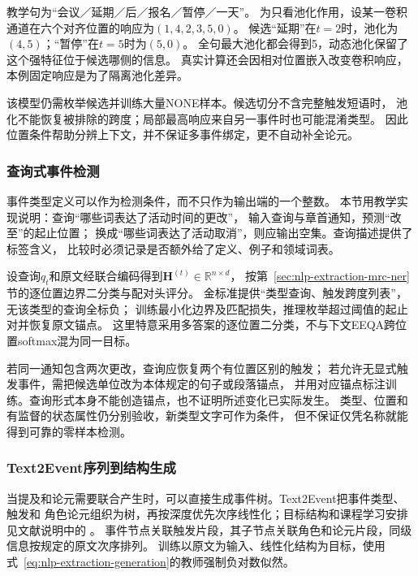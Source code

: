 教学句为“会议／延期／后／报名／暂停／一天”。
为只看池化作用，设某一卷积通道在六个对齐位置的响应为$(1,4,2,3,5,0)$。
候选“延期”在$t=2$时，池化为$(4,5)$；“暂停”在$t=5$时为$(5,0)$。
全句最大池化都会得到5，动态池化保留了这个强特征位于候选哪侧的信息。
真实计算还会因相对位置嵌入改变卷积响应，本例固定响应是为了隔离池化差异。

该模型仍需枚举候选并训练大量NONE样本。候选切分不含完整触发短语时，
池化不能恢复被排除的跨度；局部最高响应来自另一事件时也可能混淆类型。
因此位置条件帮助分辨上下文，并不保证多事件绑定，更不自动补全论元。

\subsubsection{查询式事件检测}
\label{sec:nlp-extraction-event-query}

事件类型定义可以作为检测条件，而不只作为输出端的一个整数。
本节用教学实现说明：查询“哪些词表达了活动时间的更改”，
输入查询与章首通知，预测“改至”的起止位置；
换成“哪些词表达了活动取消”，则应输出空集。查询描述提供了标签含义，
比较时必须记录是否额外给了定义、例子和领域词表。

设查询$q_t$和原文经联合编码得到$\bm{H}^{(t)}\in\mathbb{R}^{n\times d}$，
按第~\ref{sec:nlp-extraction-mrc-ner}节的逐位置边界二分类与配对头评分。
金标准提供“类型查询、触发跨度列表”，无该类型的查询全标负；
训练最小化边界及匹配损失，推理枚举超过阈值的起止对并恢复原文锚点。
这里特意采用多答案的逐位置二分类，不与下文EEQA跨位置softmax混为同一目标。

若同一通知包含两次更改，查询应恢复两个有位置区别的触发；
若允许无显式触发事件，需把候选单位改为本体规定的句子或段落锚点，
并用对应锚点标注训练。查询形式本身不能创造锚点，也不证明所述变化已实际发生。
类型、位置和有监督的状态属性仍分别验收，新类型文字可作为条件，
但不保证仅凭名称就能得到可靠的零样本检测。

\subsubsection{Text2Event序列到结构生成}
\label{sec:nlp-extraction-text2event}

当提及和论元需要联合产生时，可以直接生成事件树。Text2Event把事件类型、触发和
角色论元组织为树，再按深度优先次序线性化；目标结构和课程学习安排见文献说明中的
。
事件节点关联触发片段，其子节点关联角色和论元片段，同级信息按规定的原文次序排列。
训练以原文为输入、线性化结构为目标，使用
式~\eqref{eq:nlp-extraction-generation}的教师强制负对数似然。

